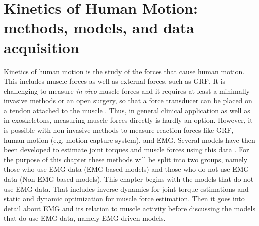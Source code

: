 
\section{Kinetics of Human Motion: methods, models, and data acquisition}
\label{sec:A-MSModels}
Kinetics of human motion is the study of the forces that cause human motion. 
This includes muscle forces as well as external forces, such as \ac{GRF}.
It is challenging to measure \textit{in vivo} muscle forces and it requires at least a minimally invasive methods or an open surgery, so that a force transducer can be placed on a tendon attached to the muscle \cite{Erdemir2007}. 
Thus, in general clinical application as well as in exoskeletons, measuring muscle forces directly is hardly an option.
However, it is possible with non-invasive methods to measure reaction forces like \ac{GRF}, human motion (e.g. motion capture system), and \ac{EMG}.
Several models have then been developed to estimate joint torques and muscle forces using this data \cite{Erdemir2007}.
For the purpose of this chapter these methods will be split into two groups, namely those who use \ac{EMG} data (\ac{EMG}-based models) and those who do not use \ac{EMG} data (Non-\ac{EMG}-based models).
This chapter begins with the models that do not use \ac{EMG} data.
That includes inverse dynamics for joint torque estimations and static and dynamic optimization for muscle force estimation. 
Then it goes into detail about \ac{EMG} and its relation to muscle activity before discussing the models that do use \ac{EMG} data, namely \ac{EMG}-driven models.

